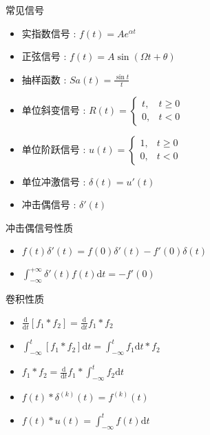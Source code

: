 \documentclass[UTF8, 12pt]{ctexart}
\begin{document}
	常见信号
	\begin{itemize}[leftmargin = 4em]
		\item 实指数信号 : $ f(t) = Ae^{\alpha t} $
		\item 正弦信号 : $ f(t) = A\sin(\Omega t + \theta) $
		\item 抽样函数 : $ Sa(t) = \frac{\sin t}{t} $
		\item 单位斜变信号 : $ R(t) = \begin{cases} t,& t \geq 0 \\ 0,& t < 0 \end{cases} $
		\item 单位阶跃信号 : $ u(t) = \begin{cases} 1,& t \geq 0 \\ 0,& t < 0 \end{cases} $
		\item 单位冲激信号 : $ \delta(t) = u'(t) $
		\item 冲击偶信号 : $ \delta'(t) $
	\end{itemize}

	冲击偶信号性质
	\begin{itemize}[leftmargin = 4em]
		\item $ f(t)\delta'(t) = f(0)\delta'(t) - f'(0)\delta(t) $
		\item $ \int_{-\infty}^{+\infty}\delta'(t)f(t)\mathrm{d}t = -f'(0) $
	\end{itemize}

	卷积性质
	\begin{itemize}[leftmargin = 4em]
		\item $ \frac{\mathrm{d}}{\mathrm{d}t}[f_{1} * f_{2}] = \frac{\mathrm{d}}{\mathrm{d}t}f_{1} * f_{2} $
		\item $ \int_{-\infty}^{t}[f_{1} * f_{2}]\mathrm{d}t = \int_{-\infty}^{t}f_{1}\mathrm{d}t * f_{2} $
		\item $ f_{1} * f_{2} = \frac{\mathrm{d}}{\mathrm{d}t}f_{1} * \int_{-\infty}^{t}f_{2}\mathrm{d}t $
		\item $ f(t) * \delta^{(k)}(t) = f^{(k)}(t) $
		\item $ f(t) * u(t) = \int_{-\infty}^{t}f(t)\mathrm{d}t $
	\end{itemize}
\end{document}

